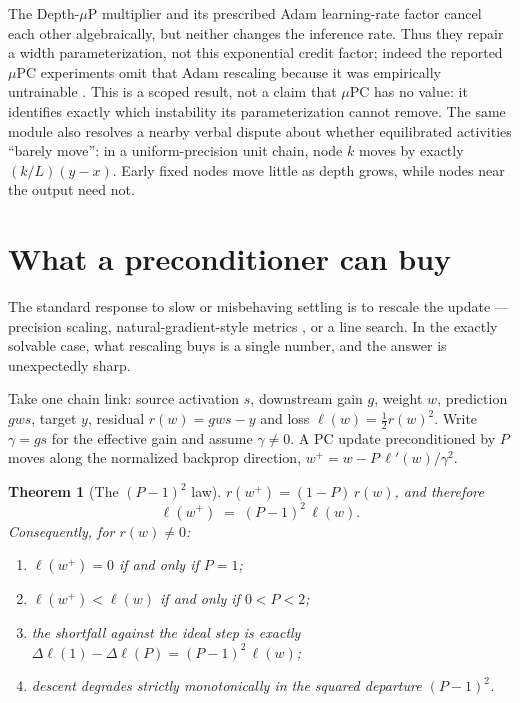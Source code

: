 \documentclass[11pt]{article}
\newtheorem{theorem}{Theorem}[section]
\begin{document}
The Depth-$\mu$P multiplier and its prescribed Adam learning-rate factor cancel each
other algebraically, but neither changes the inference rate.  Thus they repair a width
parameterization, not this exponential credit factor; indeed the reported $\mu$PC
experiments omit that Adam rescaling because it was empirically untrainable
\cite{innocentimupc2025}.  This is a scoped result, not a claim that $\mu$PC has no value:
it identifies exactly which instability its parameterization cannot remove.  The same
module also resolves a nearby verbal dispute about whether equilibrated activities
``barely move'': in a uniform-precision unit chain, node $k$ moves by exactly
$(k/L)(y-x)$.  Early fixed nodes move little as depth grows, while nodes near the output
need not.

\section{What a preconditioner can buy}
\label{sec:precond}

The standard response to slow or misbehaving settling is to rescale the update ---
precision scaling, natural-gradient-style metrics \cite{ofner2021}, or a line search. In
the exactly solvable case, what rescaling buys is a single number, and the answer is
unexpectedly sharp.

Take one chain link: source activation $s$, downstream gain $g$, weight $w$, prediction
$g w s$, target $y$, residual $r(w) = gws - y$ and loss $\ell(w) = \tfrac12 r(w)^2$.
Write $\gamma = gs$ for the effective gain and assume $\gamma \neq 0$. A PC update
preconditioned by $P$ moves along the normalized backprop direction,
$w^+ = w - P\,\ell'(w)/\gamma^2$.

\begin{theorem}[The $(P-1)^2$ law]\label{thm:precond}
$r(w^+) = (1-P)\,r(w)$, and therefore
\[
\ell(w^+) \;=\; (P-1)^2\, \ell(w).
\]
Consequently, for $r(w) \neq 0$:
\begin{enumerate}
\item $\ell(w^+) = 0$ \emph{if and only if} $P = 1$;
\item $\ell(w^+) < \ell(w)$ \emph{if and only if} $0 < P < 2$;
\item the shortfall against the ideal step is exactly
  $\Delta\ell(1) - \Delta\ell(P) = (P-1)^2\,\ell(w)$;
\item descent degrades strictly monotonically in the squared departure $(P-1)^2$.
\end{enumerate}
\end{theorem}
\end{document}

